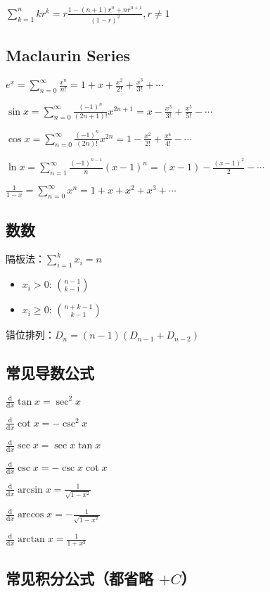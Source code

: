 \documentclass[9pt,landscape]{article}
\begin{document}
\begin{multicols}{3}
$\sum_{k=1}^{n}kr^k=r\frac{1-(n+1)r^n+nr^{n+1}}{(1-r)^2}, r\neq 1$

\subsection{Maclaurin Series}

$e^x = \sum_{n=0}^{\infty} \frac{x^n}{n!} = 1 + x + \frac{x^2}{2!} + \frac{x^3}{3!} + \cdots$

$\sin x = \sum_{n=0}^{\infty} \frac{(-1)^n}{(2n+1)!}x^{2n+1} = x - \frac{x^3}{3!} + \frac{x^5}{5!} - \cdots$

$\cos x = \sum_{n=0}^{\infty} \frac{(-1)^n}{(2n)!}x^{2n} = 1 - \frac{x^2}{2!} + \frac{x^4}{4!} - \cdots$

$\ln x = \sum_{n=1}^{\infty} \frac{(-1)^{n-1}}{n}(x-1)^n = (x-1) - \frac{(x-1)^2}{2} - \cdots$

$\frac{1}{1-x} = \sum_{n=0}^{\infty} x^n = 1 + x + x^2 + x^3 + \cdots$

\subsection{数数}

隔板法：$\sum_{i=1}^{k} x_i=n$
\begin{itemize}
	\item $x_i>0$: $\binom{n-1}{k-1}$
	\item $x_i\ge 0$: $\binom{n+k-1}{k-1}$
\end{itemize}

错位排列：$D_n=(n-1)\left(D_{n-1}+D_{n-2}\right)$

\subsection{常见导数公式}

$\frac{\mathrm{d}}{\mathrm{d}x}\tan x=\sec ^{2}x$

$\frac{\mathrm{d}}{\mathrm{d}x}\cot x=-\csc ^{2}x$

$\frac{\mathrm{d}}{\mathrm{d}x}\sec x=\sec x\tan x$

$\frac{\mathrm{d}}{\mathrm{d}x}\csc x=-\csc x\cot x$

$\frac{\mathrm{d}}{\mathrm{d}x}\arcsin x={\frac {1}{\sqrt {1-x^{2}}}}$

$\frac{\mathrm{d}}{\mathrm{d}x}\arccos x=-{\frac {1}{\sqrt {1-x^{2}}}}$

$\frac{\mathrm{d}}{\mathrm{d}x}\arctan x={\frac {1}{1+x^{2}}}$

\subsection{常见积分公式（都省略 $+C$）}


\end{multicols}
\end{document}
